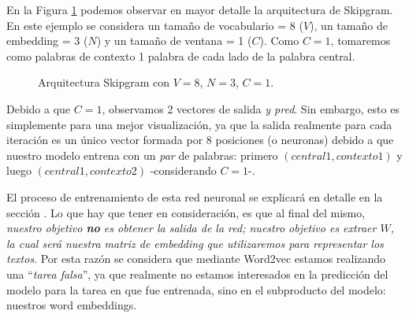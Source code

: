 \documentclass[12pt,a4paper]{article}
\begin{document}
\begin{sloppypar}
En la Figura \ref{fig:Imagen_NLP_23} podemos observar en mayor detalle la arquitectura de Skipgram. En este ejemplo se considera un tamaño de vocabulario = 8 ($V$), un tamaño de embedding = 3 ($N$) y un tamaño de ventana = 1 ($C$). Como $C=1$, tomaremos como palabras de contexto 1 palabra de cada lado de la palabra central.

\begin{figure}[H]  
\centering
\noindent{}
\caption{Arquitectura Skipgram con $V=8$, $N=3$, $C=1$.}
\label{fig:Imagen_NLP_23}
\end{figure}

Debido a que $C=1$, observamos 2 vectores de salida \textit{y pred}. Sin embargo, esto es simplemente para una mejor visualización, ya que la salida realmente para cada iteración es un único vector formada por 8 posiciones (o neuronas) debido a que nuestro modelo entrena con un \textit{par} de palabras: primero $(central1, contexto1)$ y luego $(central1, contexto2)$ -considerando $C=1$-. 

El proceso de entrenamiento de esta red neuronal se explicará en detalle en la sección \textit{}. Lo que hay que tener en consideración, es que al final del mismo, \textit{nuestro objetivo \textbf{no} es obtener la salida de la red; nuestro objetivo es extraer $W$, la cual será nuestra matriz de embedding que utilizaremos para representar los textos}. Por esta razón se considera que mediante Word2vec estamos realizando una “\textit{tarea falsa}”, ya que realmente no estamos interesados en la predicción del modelo para la tarea en que fue entrenada, sino en el subproducto del modelo: nuestros word embeddings.


\end{sloppypar}
\end{document}
